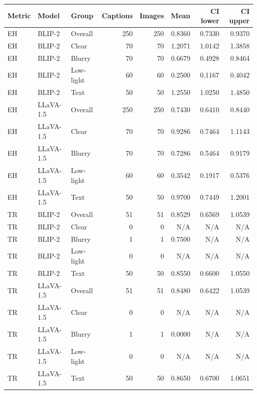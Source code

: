 \begin{tabular}{lllrrrrr}
\toprule
Metric & Model & Group & Captions & Images & Mean & CI lower & CI upper \\
\midrule
EH & BLIP-2 & Overall & 250 & 250 & 0.8360 & 0.7330 & 0.9370 \\
EH & BLIP-2 & Clear & 70 & 70 & 1.2071 & 1.0142 & 1.3858 \\
EH & BLIP-2 & Blurry & 70 & 70 & 0.6679 & 0.4928 & 0.8464 \\
EH & BLIP-2 & Low-light & 60 & 60 & 0.2500 & 0.1167 & 0.4042 \\
EH & BLIP-2 & Text & 50 & 50 & 1.2550 & 1.0250 & 1.4850 \\
EH & LLaVA-1.5 & Overall & 250 & 250 & 0.7430 & 0.6410 & 0.8440 \\
EH & LLaVA-1.5 & Clear & 70 & 70 & 0.9286 & 0.7464 & 1.1143 \\
EH & LLaVA-1.5 & Blurry & 70 & 70 & 0.7286 & 0.5464 & 0.9179 \\
EH & LLaVA-1.5 & Low-light & 60 & 60 & 0.3542 & 0.1917 & 0.5376 \\
EH & LLaVA-1.5 & Text & 50 & 50 & 0.9700 & 0.7449 & 1.2001 \\
TR & BLIP-2 & Overall & 51 & 51 & 0.8529 & 0.6569 & 1.0539 \\
TR & BLIP-2 & Clear & 0 & 0 & N/A & N/A & N/A \\
TR & BLIP-2 & Blurry & 1 & 1 & 0.7500 & N/A & N/A \\
TR & BLIP-2 & Low-light & 0 & 0 & N/A & N/A & N/A \\
TR & BLIP-2 & Text & 50 & 50 & 0.8550 & 0.6600 & 1.0550 \\
TR & LLaVA-1.5 & Overall & 51 & 51 & 0.8480 & 0.6422 & 1.0539 \\
TR & LLaVA-1.5 & Clear & 0 & 0 & N/A & N/A & N/A \\
TR & LLaVA-1.5 & Blurry & 1 & 1 & 0.0000 & N/A & N/A \\
TR & LLaVA-1.5 & Low-light & 0 & 0 & N/A & N/A & N/A \\
TR & LLaVA-1.5 & Text & 50 & 50 & 0.8650 & 0.6700 & 1.0651 \\
\bottomrule
\end{tabular}
